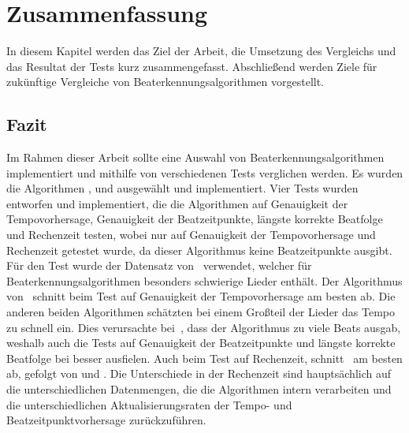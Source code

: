 \chapter{Zusammenfassung}
\label{zusammenfassung}
\acresetall

In diesem Kapitel werden das Ziel der Arbeit, die Umsetzung des Vergleichs und das Resultat der Tests kurz zusammengefasst.
Abschlie{\ss}end werden Ziele für zukünftige Vergleiche von Beaterkennungsalgorithmen vorgestellt.

\section{Fazit}
{
	Im Rahmen dieser Arbeit sollte eine Auswahl von Beaterkennungsalgorithmen implementiert
		und mithilfe von verschiedenen Tests verglichen werden.
	Es wurden die Algorithmen \cite{2001_BeatThis}, \cite{2009_DaPlSt} und \cite{2011_PlRoSt} ausgewählt und implementiert.
	Vier Tests wurden entworfen und implementiert,
		die die Algorithmen auf Genauigkeit der Tempovorhersage, Genauigkeit der Beatzeitpunkte, längste korrekte Beatfolge und Rechenzeit testen,
		wobei \cite{2001_BeatThis} nur auf Genauigkeit der Tempovorhersage und Rechenzeit getestet wurde,
		da dieser Algorithmus keine Beatzeitpunkte ausgibt.
	Für den Test wurde der Datensatz von~\cite{2012_HoDaZaOlGo} verwendet,
		welcher für Beaterkennungsalgorithmen besonders schwierige Lieder enthält.
	Der Algorithmus von~\cite{2009_DaPlSt} schnitt beim Test auf Genauigkeit der Tempovorhersage am besten ab.
	Die anderen beiden Algorithmen schätzten bei einem Gro{\ss}teil der Lieder das Tempo zu schnell ein.
	Dies verursachte bei~\cite{2011_PlRoSt},
		dass der Algorithmus zu viele Beats ausgab,
		weshalb auch die Tests auf Genauigkeit der Beatzeitpunkte und längste korrekte Beatfolge bei \cite{2009_DaPlSt} besser ausfielen.
	Auch beim Test auf Rechenzeit,
		schnitt~\cite{2009_DaPlSt} am besten ab,
		gefolgt von \cite{2001_BeatThis} und \cite{2011_PlRoSt}.
	Die Unterschiede in der Rechenzeit sind hauptsächlich auf die unterschiedlichen Datenmengen,
		die die Algorithmen intern verarbeiten
		und die unterschiedlichen Aktualisierungsraten der Tempo- und Beatzeitpunktvorhersage zurückzuführen.
}

